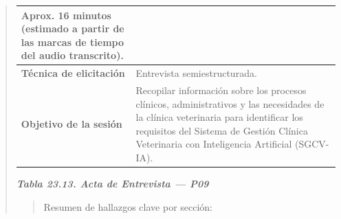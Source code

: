 \documentclass[
]{article}
\begin{document}
\begin{quote}
{\begin{longtable}[]{|
  >{\raggedright\arraybackslash}p{}|
  >{\raggedright\arraybackslash}p{}|}
\begin{minipage}[t]{\linewidth}
Aprox. 16 minutos (estimado a partir de las marcas de tiempo del audio transcrito).
\end{minipage} \\
\hline
\textbf{Técnica de elicitación} & \begin{minipage}[t]{\linewidth}\raggedright
Entrevista semiestructurada.
\end{minipage} \\
\hline
\textbf{Objetivo de la sesión} & \begin{minipage}[t]{\linewidth}\raggedright
Recopilar información sobre los procesos clínicos, administrativos y las necesidades de la clínica veterinaria para identificar los requisitos del Sistema de Gestión Clínica Veterinaria con Inteligencia Artificial (SGCV-IA).
\end{minipage} \\
\hline
\end{longtable}
}

\protect{}\label{_bookmark_P09_acta}{}\emph{\textbf{Tabla 23.13. Acta de Entrevista --- P09}}

\begin{quote}
Resumen de hallazgos clave por sección:
\end{quote}


\end{quote}
\end{document}
